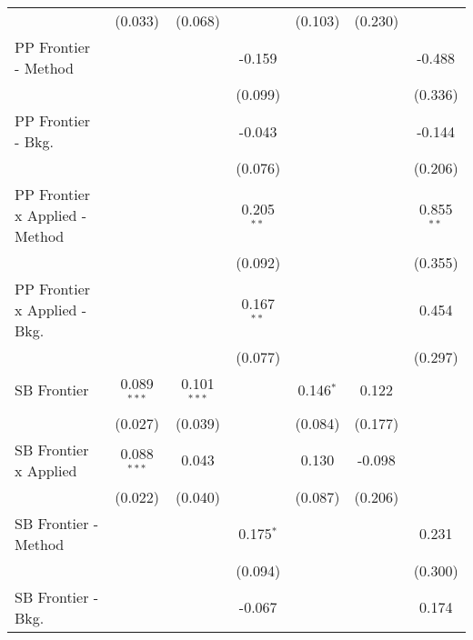 \begin{tabular}{lcccccc}
                                  & (0.033)       & (0.068)       &               & (0.103)       & (0.230)       &   \\   
   PP Frontier - Method           &               &               & -0.159        &               &               & -0.488\\   
                                  &               &               & (0.099)       &               &               & (0.336)\\   
   PP Frontier - Bkg.             &               &               & -0.043        &               &               & -0.144\\   
                                  &               &               & (0.076)       &               &               & (0.206)\\   
   PP Frontier x Applied - Method &               &               & 0.205$^{**}$  &               &               & 0.855$^{**}$\\   
                                  &               &               & (0.092)       &               &               & (0.355)\\   
   PP Frontier x Applied - Bkg.   &               &               & 0.167$^{**}$  &               &               & 0.454\\   
                                  &               &               & (0.077)       &               &               & (0.297)\\   
   SB Frontier                    & 0.089$^{***}$ & 0.101$^{***}$ &               & 0.146$^{*}$   & 0.122         &   \\   
                                  & (0.027)       & (0.039)       &               & (0.084)       & (0.177)       &   \\   
   SB Frontier x Applied          & 0.088$^{***}$ & 0.043         &               & 0.130         & -0.098        &   \\   
                                  & (0.022)       & (0.040)       &               & (0.087)       & (0.206)       &   \\   
   SB Frontier - Method           &               &               & 0.175$^{*}$   &               &               & 0.231\\   
                                  &               &               & (0.094)       &               &               & (0.300)\\   
   SB Frontier - Bkg.             &               &               & -0.067        &               &               & 0.174\\   

\end{tabular}
